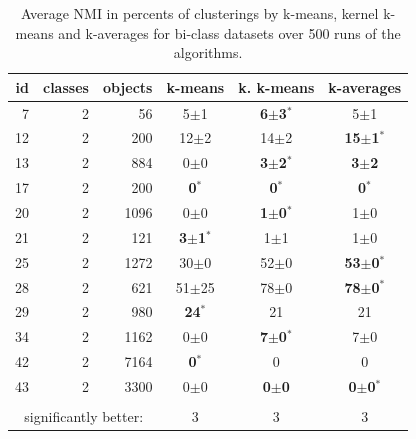 \documentclass[twoside,11pt]{article}
\begin{document}

\begin{table} 
\begin{center} 
\caption{Average NMI in percents of clusterings by k-means, kernel k-means and k-averages for bi-class datasets over 500 runs of the algorithms.}
\label{tab:results-2} 
\begin{tabular}{rrrccc} 
id & classes & objects & k-means & k. k-means & k-averages \\ 
\hline 
 7 & 2 &   56 & 5$\pm$1 & \textbf{6$\pm$3$^*$} & 5$\pm$1 \\ 
12 & 2 &  200 & 12$\pm$2 & 14$\pm$2 & \textbf{15$\pm$1$^*$} \\ 
13 & 2 &  884 & 0$\pm$0 & \textbf{3$\pm$2$^*$} & \textbf{3$\pm$2} \\ 
17 & 2 &  200 & \textbf{0$^*$} & \textbf{0$^*$} & \textbf{0$^*$} \\ 
20 & 2 & 1096 & 0$\pm$0 & \textbf{1$\pm$0$^*$} & 1$\pm$0 \\ 
21 & 2 &  121 & \textbf{3$\pm$1$^*$} & 1$\pm$1 & 1$\pm$0 \\ 
25 & 2 & 1272 & 30$\pm$0 & 52$\pm$0 & \textbf{53$\pm$0$^*$} \\ 
28 & 2 &  621 & 51$\pm$25 &  78$\pm$0 & \textbf{ 78$\pm$0$^*$} \\ 
29 & 2 &  980 & \textbf{24$^*$} & 21 & 21 \\ 
34 & 2 & 1162 & 0$\pm$0 & \textbf{7$\pm$0$^*$} & 7$\pm$0 \\ 
42 & 2 & 7164 & \textbf{0$^*$} & 0 & 0 \\ 
43 & 2 & 3300 & 0$\pm$0 & \textbf{0$\pm$0} & \textbf{0$\pm$0$^*$} \\ 
\hline 
\vspace{-.2cm} \\
\multicolumn{3}{c}{significantly better:}  & 3 & 3 & 3 \\ 
\end{tabular} 
\end{center} 
\end{table} 
 
 
\end{document}
